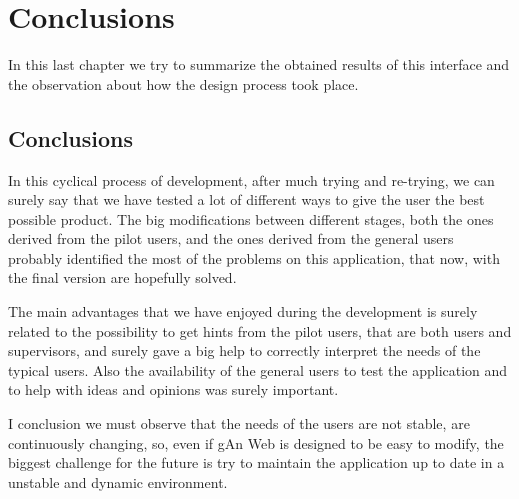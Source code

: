 
\chapter{Conclusions} %

\label{Chapter9} %

In this last chapter we try to summarize the obtained results of this interface and the observation about how the design process took place.
 
\section{Conclusions}

In this cyclical process of development, after much trying and re-trying, we can surely say that we have tested a lot of different ways to give the user the best possible product. The big modifications between different stages, both the ones derived from the pilot users, and the ones derived from the general users probably identified the most of the problems on this application, that now, with the final version are hopefully solved.

The main advantages that we have enjoyed during the development is surely related to the possibility to get hints from the pilot users, that are both users and supervisors, and surely gave a big help to correctly interpret the needs of the typical users. Also the availability of the general users to test the application and to help with ideas and opinions was surely important.

I conclusion we must observe that the needs of the users are not stable, are continuously changing, so, even if gAn Web is designed to be easy to modify, the biggest challenge for the future is try to maintain the application up to date in a unstable and dynamic environment.  


